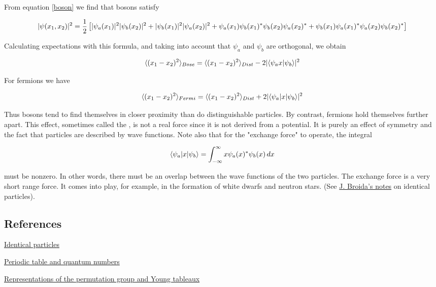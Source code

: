 From equation  \eqref{boson} we find that bosons satisfy

\begin{equation}
|\psi(x_1,x_2)|^2 = \frac{1}{2}\left[   |\psi_a(x_1)|^2  |\psi_b(x_2)|^2 
+ |\psi_b(x_1)|^2  |\psi_a(x_2)|^2 \\
+ \psi_a(x_1)\psi_b(x_1)^*\psi_b(x_2)\psi_a(x_2)^* \\
+ \psi_b(x_1)\psi_a(x_1)^*\psi_a(x_2)\psi_b(x_2)^* \right]
\end{equation}

Calculating expectations with this formula, and taking into account that $\psi_a$ and $\psi_b$ are orthogonal, we obtain

\begin{equation}
\langle (x_1 - x_2)^2 \rangle_{Bose} = \langle (x_1 - x_2)^2 \rangle_{Dist} - 2|\langle\psi_a x | \psi_b \rangle|^2
\end{equation}

For fermions we have

\begin{equation}
\langle (x_1 - x_2)^2 \rangle_{Fermi} = \langle (x_1 - x_2)^2 \rangle_{Dist} + 2|\langle\psi_a | x | \psi_b \rangle|^2
\end{equation}

Thus bosons tend to find themselves in closer proximity than do distinguishable particles.  By contrast, fermions hold themselves further apart.  This effect, sometimes called the   , is not a real force since it is not derived from a potential.  It is purely an effect of symmetry and the fact that particles are described by wave functions.  Note also that for the "exchange force" to operate, the integral

\begin{equation}
\langle\psi_a | x | \psi_b \rangle = \int^\infty_{-\infty} x\psi_a(x)^*\psi_b(x)\, dx
\end{equation}

must be nonzero.  In other words, there must be an overlap between the wave functions of the two particles.  The exchange force is a very short range force.  It comes into play, for example, in the formation of white dwarfs and neutron stars. (See \href{http://physics.ucsd.edu/students/courses/fall2009/physics130b/IdentParts.pdf}{J. Broida's notes} on identical particles).




\subsection{References}

\begin{thebibliography}

 \href{http://physics.ucsd.edu/students/courses/fall2009/physics130b/IdentParts.pdf}{Identical particles} 

 \href{http://hyperphysics.phy-astr.gsu.edu/hbase/chemical/eleorb.html}{Periodic table and quantum numbers}

 \href{http://yufeizhao.com/papers/youngtab-hcmr.pdf}{Representations of the permutation group and Young tableaux}


\end{thebibliography}

